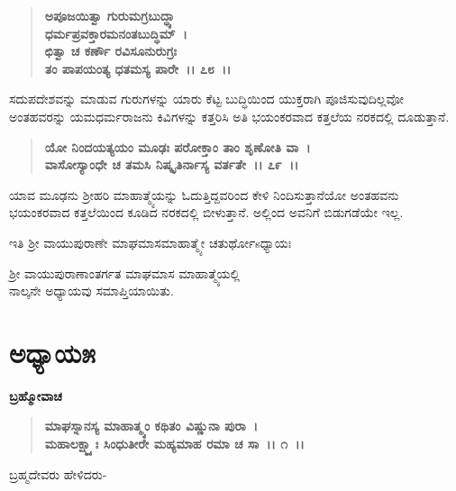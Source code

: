 \begin{verse}
\textbf{ಅಪೂಜಯಿತ್ವಾ ಗುರುಮಗ್ರಬುದ್ಧ್ಯಾ}\\\textbf{ಧರ್ಮಪ್ರವಕ್ತಾರಮನಂತಬುದ್ಧಿಮ್~।}\\\textbf{ಛಿತ್ವಾ ಚ ಕರ್ಣೌ ರವಿಸೂನುರುಗ್ರಃ} \\\textbf{ತಂ ಪಾಪಯಂತ್ಯ ಧತಮಸ್ಯ ಪಾರೇ~।। ೭೮~।।}
\end{verse}

ಸದುಪದೇಶವನ್ನು ಮಾಡುವ ಗುರುಗಳನ್ನು ಯಾರು ಕೆಟ್ಟ ಬುದ್ಧಿಯಿಂದ ಯುಕ್ತರಾಗಿ ಪೂಜಿಸುವುದಿಲ್ಲವೋ ಅಂತಹವರನ್ನು ಯಮಧರ್ಮರಾಜನು ಕಿವಿಗಳನ್ನು ಕತ್ತರಿಸಿ ಅತಿ ಭಯಂಕರವಾದ ಕತ್ತಲೆಯ ನರಕದಲ್ಲಿ ದೂಡುತ್ತಾನೆ.

\begin{verse}
\textbf{ಯೋ ನಿಂದಯತ್ಯಯಂ ಮೂಢಃ ಪರೋಕ್ತಾಂ ತಾಂ ಶೃಣೋತಿ ವಾ~।}\\\textbf{ವಾಸೋಸ್ಯಾಂಧೇ ಚ ತಮಸಿ ನಿಷ್ಕೃತಿರ್ನಾಸ್ಯ ವರ್ತತೇ~।। ೭೯~।।}
\end{verse}

ಯಾವ ಮೂಢನು ಶ‍್ರೀಹರಿ ಮಾಹಾತ್ಮ್ಯೆಯನ್ನು ಓದುತ್ತಿದ್ದವರಿಂದ ಕೇಳಿ ನಿಂದಿಸುತ್ತಾನೆಯೋ ಅಂತಹವನು ಭಯಂಕರವಾದ ಕತ್ತಲೆಯಿಂದ ಕೂಡಿದ ನರಕದಲ್ಲಿ ಬೀಳುತ್ತಾನೆ. ಅಲ್ಲಿಂದ ಅವನಿಗೆ ಬಿಡುಗಡೆಯೇ ಇಲ್ಲ.

\begin{center}
ಇತಿ ಶ‍್ರೀ ವಾಯುಪುರಾಣೇ ಮಾಘಮಾಸಮಾಹಾತ್ಮ್ಯೇ ಚತುರ್ಥೋsಧ್ಯಾಯಃ
\end{center}

\begin{center}
 ಶ‍್ರೀ ವಾಯುಪುರಾಣಾಂತರ್ಗತ ಮಾಘಮಾಸ ಮಾಹಾತ್ಮ್ಯೆಯಲ್ಲಿ \\ ನಾಲ್ಕನೇ ಅಧ್ಯಾಯವು ಸಮಾಪ್ತಿಯಾಯಿತು.
\end{center}

\newpage

\section*{ಅಧ್ಯಾಯ\enginline{-}೫}

\emptypage

\begin{flushleft}
\textbf{ಬ್ರಹ್ಮೋವಾಚ\enginline{-}}
\end{flushleft}

\begin{verse}
\textbf{ಮಾಘಸ್ನಾನಸ್ಯ ಮಾಹಾತ್ಮ್ಯಂ ಕಥಿತಂ ವಿಷ್ಣುನಾ ಪುರಾ~। }\\\textbf{ಮಹಾಲಕ್ಷ್ಮ್ಯಾಃ ಸಿಂಧುತೀರೇ ಮಹ್ಯಮಾಹ ರಮಾ ಚ ಸಾ~।। ೧~।।}
\end{verse}

\begin{flushleft}
ಬ್ರಹ್ಮದೇವರು ಹೇಳಿದರು-
\end{flushleft}

